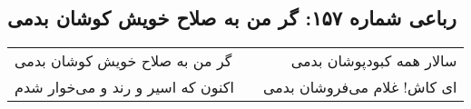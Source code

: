 \begin{center}
\section*{رباعی شماره ۱۵۷: گر من به صلاح خویش کوشان بدمی}
\label{sec:157}
\begin{longtable}{l p{0.5cm} r}
گر من به صلاح خویش کوشان بدمی
&&
سالار همه کبودپوشان بدمی
\\
اکنون که اسیر و رند و می‌خوار شدم
&&
ای کاش! غلام می‌فروشان بدمی
\\
\end{longtable}
\end{center}
